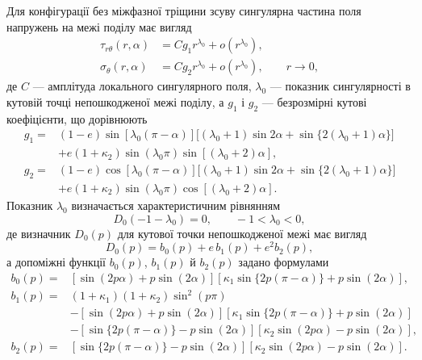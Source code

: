 Для конфігурації без міжфазної тріщини зсуву сингулярна частина поля напружень на межі поділу має вигляд~\citep{NazarenkoKipnis2022Stress}
\begin{equation}
\label{eq:app-intact-field}
\begin{aligned}
  \tau_{r\theta}(r,\alpha)
    &=Cg_1r^{\lambda_0}+o\!\left(r^{\lambda_0}\right),\\
  \sigma_\theta(r,\alpha)
    &=Cg_2r^{\lambda_0}+o\!\left(r^{\lambda_0}\right),
    \qquad r\to0,
\end{aligned}
\end{equation}
де $C$ — амплітуда локального сингулярного поля, $\lambda_0$ — показник сингулярності в кутовій точці непошкодженої межі поділу, а $g_1$ і $g_2$ — безрозмірні кутові коефіцієнти, що дорівнюють
\begin{equation*}
\begin{aligned}
  g_1={}&(1-e)\sin[\lambda_0(\pi-\alpha)]
  \bigl[(\lambda_0+1)\sin2\alpha
       +\sin\{2(\lambda_0+1)\alpha\}\bigr]\\
  &+e(1+\kappa_2)\sin(\lambda_0\pi)
      \sin[(\lambda_0+2)\alpha],\\[2pt]
  g_2={}&(1-e)\cos[\lambda_0(\pi-\alpha)]
  \bigl[(\lambda_0+1)\sin2\alpha
       +\sin\{2(\lambda_0+1)\alpha\}\bigr]\\
  &+e(1+\kappa_2)\sin(\lambda_0\pi)
      \cos[(\lambda_0+2)\alpha].
\end{aligned}
\end{equation*}
Показник $\lambda_0$ визначається характеристичним рівнянням
\begin{equation}
\label{eq:app-D0-root}
  D_0(-1-\lambda_0)=0,
  \qquad -1<\lambda_0<0,
\end{equation}
де визначник $D_0(p)$ для кутової точки непошкодженої межі має вигляд
\begin{equation*}
  D_0(p)=b_0(p)+e\,b_1(p)+e^2b_2(p),
\end{equation*}
а допоміжні функції $b_0(p)$, $b_1(p)$ й $b_2(p)$ задано формулами
\begin{equation*}
\begin{aligned}
  b_0(p)={}&
  [\sin(2p\alpha)+p\sin(2\alpha)]
  [\kappa_1\sin\{2p(\pi-\alpha)\}+p\sin(2\alpha)],\\[2pt]
  b_1(p)={}&(1+\kappa_1)(1+\kappa_2)\sin^2(p\pi)\\
  &-[\sin(2p\alpha)+p\sin(2\alpha)]
    [\kappa_1\sin\{2p(\pi-\alpha)\}+p\sin(2\alpha)]\\
  &-[\sin\{2p(\pi-\alpha)\}-p\sin(2\alpha)]
    [\kappa_2\sin(2p\alpha)-p\sin(2\alpha)],\\[2pt]
  b_2(p)={}&
  [\sin\{2p(\pi-\alpha)\}-p\sin(2\alpha)]
  [\kappa_2\sin(2p\alpha)-p\sin(2\alpha)].
\end{aligned}
\end{equation*}
